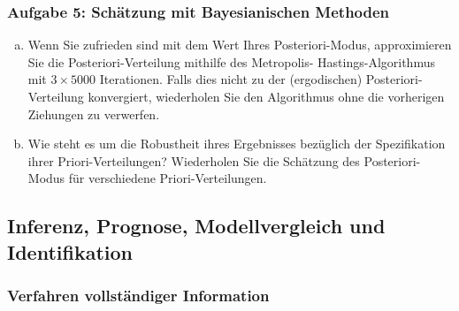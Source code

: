 \documentclass{beamer} %
\newcounter{saveenumi}
\newcommand{\seti}{\setcounter{saveenumi}{\value{enumi}}}
\newcommand{\conti}{\setcounter{enumi}{\value{saveenumi}}}
\begin{document}
\begin{frame}\frametitle{Aufgabe 5: Sch\"{a}tzung mit Bayesianischen Methoden}
  \begin{enumerate}[(a)]\conti
      \item Wenn Sie zufrieden sind mit dem Wert Ihres Posteriori-Modus, approximieren Sie die Posteriori-Verteilung mithilfe des Metropolis- Hastings-Algorithmus mit $3\times 5000$ Iterationen. Falls dies nicht zu der (ergodischen) Posteriori-Verteilung konvergiert, wiederholen Sie den Algorithmus ohne die vorherigen Ziehungen zu verwerfen.
  \item Wie steht es um die Robustheit ihres Ergebnisses bezüglich der Spezifikation ihrer Priori-Verteilungen? Wiederholen Sie die Schätzung des Posteriori-Modus für verschiedene Priori-Verteilungen.
\seti\end{enumerate}
\end{frame}


\subsection{Inferenz, Prognose, Modellvergleich und Identifikation}
\begin{frame}\frametitle{Verfahren vollst\"{a}ndiger Information}
  \tableofcontents[currentsection]
\end{frame}
\end{document}
